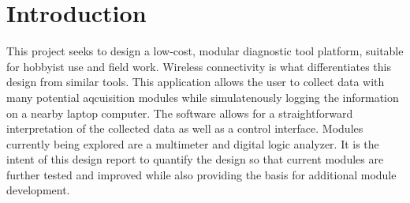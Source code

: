 \section[Introduction]{Introduction}
This project seeks to design a low-cost, modular diagnostic tool platform, 
suitable for hobbyist use and field work. Wireless connectivity is what differentiates
this design from similar tools. This application allows the user to collect
data with many potential aqcuisition modules while simulatenously logging the
information on a nearby laptop computer. The software allows for a
straightforward interpretation of the collected data as well as a control interface.
Modules currently being explored are a multimeter and digital logic analyzer. 
It is the intent of this design report to quantify the design so that current
modules are further tested and improved while also providing the basis for
additional module development.
   

